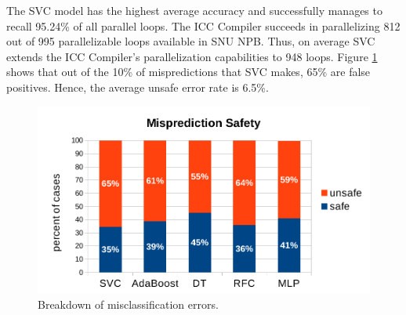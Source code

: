 The SVC model has the highest average accuracy and successfully manages to recall 95.24\% of all parallel loops. The ICC Compiler succeeds in parallelizing 812 out of 995 parallelizable loops available in SNU NPB. Thus, on average SVC extends the ICC Compiler's parallelization capabilities to 948 loops. Figure \ref{fig:prediction_stats} shows that out of the 10\% of mispredictions that SVC makes, 65\% are false positives. Hence, the average unsafe error rate is 6.5\%.
\begin{figure}[ht]
\includegraphics[width=1.0\textwidth]{images/prediction_stats.pdf}
\caption{Breakdown of misclassification errors.}
\label{fig:prediction_stats}
\vspace{-5mm}
\end{figure}

